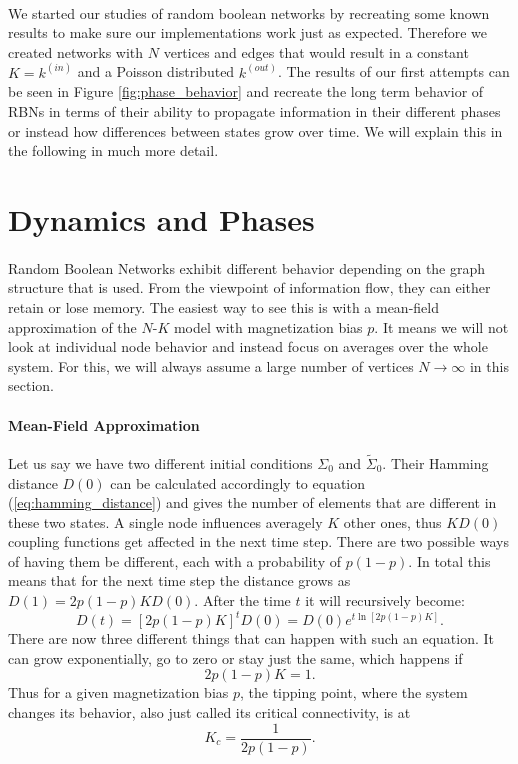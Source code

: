 \paragraph*{}
We started our studies of random boolean networks by recreating some known results to make sure our implementations work just as expected. Therefore we created networks with $N$ vertices and edges that would result in a constant $K=k^{(in)}$ and a Poisson distributed $k^{(out)}$. The results of our first attempts can be seen in Figure \ref{fig:phase_behavior} and recreate the long term behavior of RBNs in terms of their ability to propagate information in their different phases or instead how differences between states grow over time. We will explain this in the following in much more detail.

\section{Dynamics and Phases}
\paragraph*{}
Random Boolean Networks exhibit different behavior depending on the graph structure that is used. From the viewpoint of information flow, they can either retain or lose memory. The easiest way to see this is with a mean-field approximation of the $N $-$K $ model with magnetization bias $p$. It means we will not look at individual node behavior and instead focus on averages over the whole system. For this, we will always assume a large number of vertices $N\longrightarrow\infty$ in this section.

\paragraph{Mean-Field Approximation}
Let us say we have two different initial conditions $\Sigma_0$ and $\tilde{\Sigma}_0$. Their Hamming distance $D(0)$ can be calculated accordingly to equation (\ref{eq:hamming_distance}) and gives the number of elements that are different in these two states. A single node influences averagely $K$ other ones, thus $KD(0)$ coupling functions get affected in the next time step. There are two possible ways of having them be different, each with a probability of $p(1-p)$. In total this means that for the next time step the distance grows as $D(1) = 2p(1-p)KD(0)$. After the time $t$ it will recursively become:
\begin{equation}
D(t) = \left[2p(1-p)K\right]^t D(0) = D(0)e^{t\ln[2p(1-p)K]}.
\end{equation}
There are now three different things that can happen with such an equation. It can grow exponentially, go to zero or stay just the same, which happens if 
\begin{equation}\label{eq:critical_condition}
2p(1-p)K=1.
\end{equation}
Thus for a given magnetization bias $p$, the tipping point, where the system changes its behavior, also just called its critical connectivity, is at 
\begin{equation}\label{eq:critical_connectivity}
K_c = \frac{1}{2p(1-p)}.
\end{equation}
